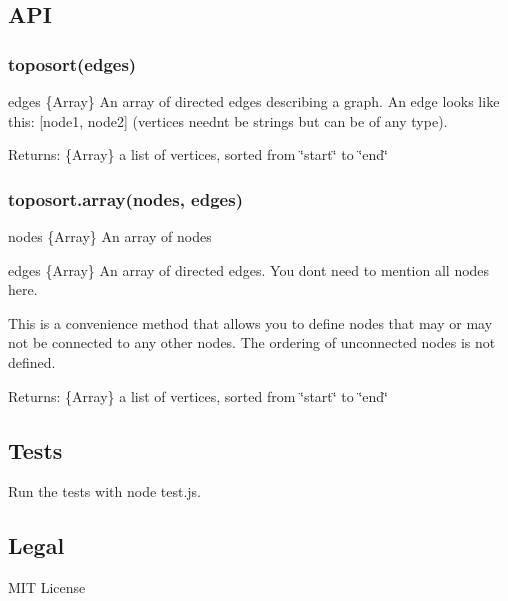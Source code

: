 \subsection*{A\+PI}

\subsubsection*{toposort(edges)}


\begin{DoxyItemize}
\item edges \{Array\} An array of directed edges describing a graph. An edge looks like this\+: {\ttfamily \mbox{[}node1, node2\mbox{]}} (vertices needn\textquotesingle{}t be strings but can be of any type).
\end{DoxyItemize}

Returns\+: \{Array\} a list of vertices, sorted from \char`\"{}start\char`\"{} to \char`\"{}end\char`\"{}

\subsubsection*{toposort.\+array(nodes, edges)}


\begin{DoxyItemize}
\item nodes \{Array\} An array of nodes
\item edges \{Array\} An array of directed edges. You don\textquotesingle{}t need to mention all {\ttfamily nodes} here.
\end{DoxyItemize}

This is a convenience method that allows you to define nodes that may or may not be connected to any other nodes. The ordering of unconnected nodes is not defined.

Returns\+: \{Array\} a list of vertices, sorted from \char`\"{}start\char`\"{} to \char`\"{}end\char`\"{}

\subsection*{Tests}

Run the tests with {\ttfamily node test.\+js}.

\subsection*{Legal}

M\+IT License 